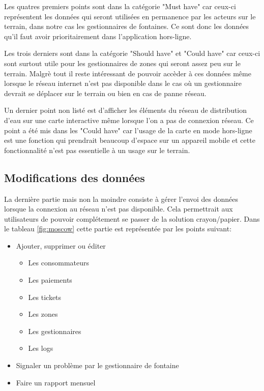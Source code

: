 \documentclass{EPL-master-thesis-covers-FR}
\begin{document}
				Les quatres premiers points sont dans la catégorie "Must have" car ceux-ci représentent les données qui seront utilisées en permanence par les acteurs sur le terrain, dans notre cas les gestionnaires de fontaines. Ce sont donc les données qu'il faut avoir prioritairement dans l'application hors-ligne.
				
				Les trois derniers sont dans la catégorie "Should have" et "Could have" car ceux-ci sont surtout utile pour les gestionnaires de zones qui seront assez peu sur le terrain. Malgrè tout il reste intéressant de pouvoir accèder à ces données même lorsque le réseau internet n'est pas disponible dans le cas où un gestionnaire devrait se déplacer sur le terrain ou bien en cas de panne réseau.
				
				Un dernier point non listé est d'afficher les éléments du réseau de distribution d'eau sur une carte interactive même lorsque l'on a pas de connexion réseau. Ce point a été mis dans les "Could have" car l'usage de la carte en mode hors-ligne est une fonction qui prendrait beaucoup d'espace sur un appareil mobile et cette fonctionnalité n'est pas essentielle à un usage sur le terrain.

			\subsection*{Modifications des données}
				\label{sec:gest_donnee}
				La dernière partie mais non la moindre consiste à gérer l'envoi des données lorsque la connexion au réseau n'est pas disponible. Cela permettrait aux utilisateurs de pouvoir complétement se passer de la solution crayon/papier.
				Dans le tableau \ref{fig:moscow} cette partie est représentée par les points suivant:
				\begin{itemize}
					\item Ajouter, supprimer ou éditer
					\begin{itemize}
						\item Les consommateurs
						\item Les paiements
						\item Les tickets
						\item Les zones
						\item Les gestionnaires
						\item Les logs
					\end{itemize}
					\item Signaler un problème par le gestionnaire de fontaine
					\item Faire un rapport mensuel
				\end{itemize}
				
\end{document}
